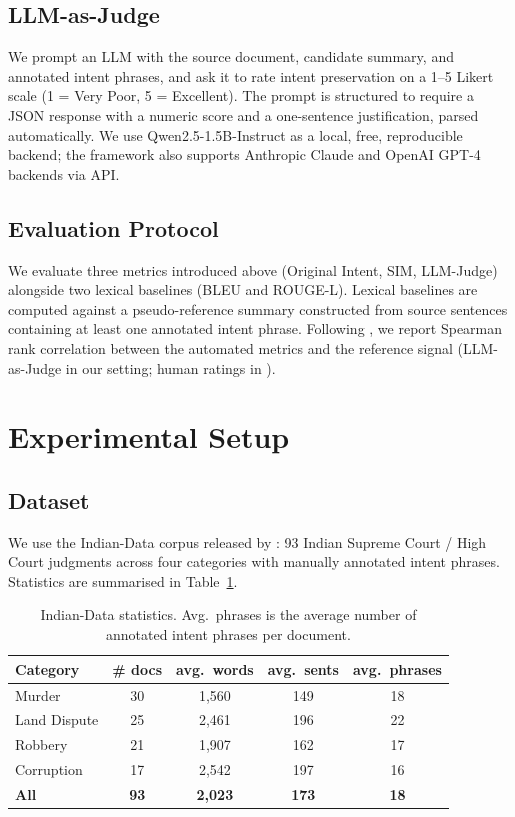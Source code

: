 \documentclass[conference,a4paper]{IEEEtran}
\begin{document}
\subsection{LLM-as-Judge}
We prompt an LLM with the source document, candidate summary, and annotated intent phrases, and ask it to rate intent preservation on a 1--5 Likert scale (1 = Very Poor, 5 = Excellent). The prompt is structured to require a JSON response with a numeric score and a one-sentence justification, parsed automatically. We use Qwen2.5-1.5B-Instruct \cite{qwen25} as a local, free, reproducible backend; the framework also supports Anthropic Claude and OpenAI GPT-4 backends via API.

\subsection{Evaluation Protocol}
We evaluate three metrics introduced above (Original Intent, SIM, LLM-Judge) alongside two lexical baselines (BLEU and ROUGE-L). Lexical baselines are computed against a pseudo-reference summary constructed from source sentences containing at least one annotated intent phrase. Following \cite{mullick2022}, we report Spearman rank correlation between the automated metrics and the reference signal (LLM-as-Judge in our setting; human ratings in \cite{mullick2022}).

\section{Experimental Setup}

\subsection{Dataset}
We use the Indian-Data corpus released by \cite{mullick2022}: 93 Indian Supreme Court / High Court judgments across four categories with manually annotated intent phrases. Statistics are summarised in Table~\ref{tab:dataset}.

\begin{table}[t]
\centering
\caption{Indian-Data statistics. Avg.~phrases is the average number of annotated intent phrases per document.}
\label{tab:dataset}
\small
\begin{tabular}{lcccc}
\toprule
Category & \# docs & avg.~words & avg.~sents & avg.~phrases \\
\midrule
Murder        & 30 & 1{,}560 & 149 & 18 \\
Land Dispute  & 25 & 2{,}461 & 196 & 22 \\
Robbery       & 21 & 1{,}907 & 162 & 17 \\
Corruption    & 17 & 2{,}542 & 197 & 16 \\
\midrule
\textbf{All}  & \textbf{93} & \textbf{2{,}023} & \textbf{173} & \textbf{18} \\
\bottomrule
\end{tabular}
\end{table}
\end{document}
